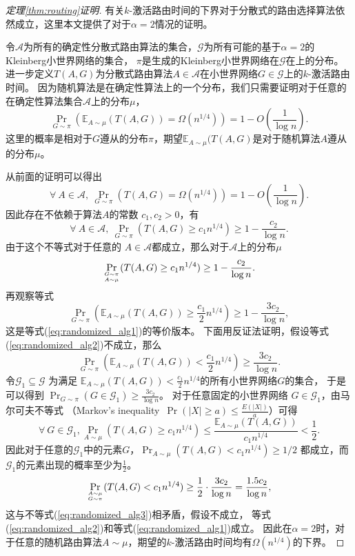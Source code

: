 \begin{proof}[定理\ref{thm:routing}证明]
有关$k$-激活路由时间的下界对于分散式的路由选择算法依然成立，这里本文提供了对于$\alpha = 2$情况的证明。

令$\mathcal{A}$为所有的确定性分散式路由算法的集合，$\mathcal{G}$为所有可能的基于$\alpha = 2$的Kleinberg小世界网络的集合，
$\pi$是生成的Kleinberg小世界网络在$\mathcal{G}$在上的分布。
进一步定义$T(A,G)$为分散式路由算法$A\in \mathcal{A}$在小世界网络$G\in \mathcal{G}$上的$k$-激活路由时间。
因为随机算法是在确定性算法上的一个分布，我们只需要证明对于任意的在确定性算法集合$\mathcal{A}$上的分布$\mu$，
\begin{equation}\label{eq:randomized_alg1}
\Pr_{G\sim \pi}(\mathbb{E}_{A\sim \mu}(T(A,G))=\Omega(n^{1/4}))=1-O(\frac{1}{\log{n}}).
\end{equation} 
这里的概率是相对于$G$遵从的分布$\pi$，期望$\mathbb{E}_{A\sim \mu}(T(A,G)$是对于随机算法$A$遵从的分布$\mu$。

从前面的证明可以得出
$$
\forall~A\in \mathcal{A},~\Pr_{G\sim \pi}(T(A,G)=\Omega(n^{1/4}))=1-O(\frac{1}{\log{n}}).
$$
因此存在不依赖于算法$A$的常数 $c_1,c_2>0$，有 
$$
\forall~A\in \mathcal{A},~\Pr_{G\sim \pi}(T(A,G)\geq c_1n^{1/4})\geq 1-\frac{c_2}{\log{n}}. 
$$
由于这个不等式对于任意的 $A\in \mathcal{A}$都成立，那么对于$\mathcal{A}$上的分布$\mu$
\begin{equation}\label{eq:randomized_alg3}
\Pr_{G\sim \pi\atop A\sim \mu}(T(A,G)\geq c_1n^{1/4})\geq 1-\frac{c_2}{\log{n}}. 
\end{equation}
再观察等式
\begin{equation}\label{eq:randomized_alg2}
\Pr_{G\sim \pi}(\mathbb{E}_{A\sim \mu}(T(A,G))\geq \frac{c_1}{2}n^{1/4})\geq 1-\frac{3c_2}{\log{n}},
\end{equation}
这是等式(\ref{eq:randomized_alg1})的等价版本。 
下面用反证法证明，假设等式(\ref{eq:randomized_alg2})不成立，那么
$$
\Pr_{G\sim \pi}(\mathbb{E}_{A\sim \mu}(T(A,G))< \frac{c_1}{2}n^{1/4})\geq \frac{3c_2}{\log{n}}.
$$
令$\mathcal{G}_1\subseteq \mathcal{G}$ 为满足 $\mathbb{E}_{A\sim \mu}(T(A,G))< \frac{c_1}{2}n^{1/4}$的所有小世界网络$G$的集合，
于是可以得到 $\Pr_{G\sim \pi}(G\in \mathcal{G}_1)\geq \frac{3c_2}{\log{n}}$。
对于任意固定的小世界网络 $G\in \mathcal{G}_1$，由马尔可夫不等式
（Markov's inequality~$\Pr(|X|\geq a) \leq \frac{E(|X|)}{a}$）可得
$$\forall~G\in \mathcal{G}_1,\Pr_{A\sim\mu}(T(A,G)\geq c_1n^{1/4})\leq \frac{\mathbb{E}_{A\sim\mu}(T(A,G))}{c_1n^{1/4}}<\frac{1}{2}.$$
因此对于任意的$\mathcal{G}_1$中的元素$G$，$\Pr_{A\sim\mu}(T(A,G)< c_1n^{1/4})\geq 1/2$ 都成立，而 $\mathcal{G}_1$的元素出现的概率至少为$\frac{1}{2}$。
$$\Pr_{A\sim\mu\atop G\sim \pi}(T(A,G)< c_1n^{1/4})\geq \frac{1}{2}\cdot \frac{3c_2}{\log{n}}=\frac{1.5c_2}{\log{n}},$$
这与不等式(\ref{eq:randomized_alg3})相矛盾，假设不成立，
等式(\ref{eq:randomized_alg2})和等式(\ref{eq:randomized_alg1})成立。
因此在$\alpha=2$时，对于任意的随机路由算法$A\sim \mu$，期望的$k$-激活路由时间均有$\Omega(n^{1/4})$的下界。
\end{proof}



